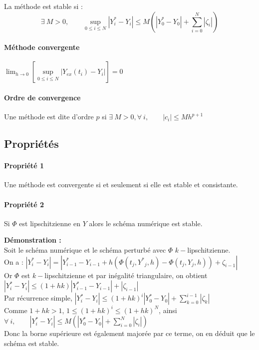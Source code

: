 \documentclass[10pt]{article}
\begin{document}
La méthode est stable si :
 \[\displaystyle \exists~ M>0, \qquad 
 \sup\limits_{0 \leq i \leq N} 
 |   {Y}^*_{i}  -   {Y}_{i} 
 | \leq 
 M \left(|  {Y}^*_0-  {Y_0} |+\sum_{i=0}^N |\zeta_i|\right)  \]

\paragraph{Méthode convergente}
\hfill$ \displaystyle\lim_{h\to 0}\left[\sup\limits_{0\leq i\leq N} |  {Y}_{ex}(t_i)-  {Y}_i| \right] = 0$\hfill ~


\paragraph{Ordre de convergence} Une méthode est dite d'ordre $p$ si $\displaystyle\exists~ M>0, \forall~ i, \qquad |c_i| \leq M h^{p+1}$

\subsection{Propriétés} 

\paragraph{Propriété 1} Une méthode est convergente si et seulement si elle est stable et consistante.

\paragraph{Propriété 2} Si $  {\Phi}$ est lipschitzienne en $  {Y}$ alors le schéma numérique est stable.


\noindent
\textbf{Démonstration :}\\
Soit le schéma numérique et le schéma perturbé avec $  {\Phi}$ $k-$lipschitzienne. \\
On a : $|  {Y}^*_{i}  -   {Y}_{i}| = |  {Y}^*_{i-1}  -   {Y}_{i-1} + h(  {\Phi}( t_j,  {Y^*}_j,h)-  {\Phi}( t_j,  {Y}_j,h)) + \zeta_{i-1}|$\\
Or $  {\Phi}$ est $k-$lipschitzienne et par inégalité triangulaire, on obtient \\
$ |  {Y}^*_{i}  -   {Y}_{i}|\leq (1+hk) |  {Y}^*_{i-1}  -   {Y}_{i-1}| + |\zeta_{i-1}|$\\
Par récurrence simple, $ |  {Y}^*_{i}  -   {Y}_{i}|\leq (1+hk)^{i} |  {Y}^*_{0}  -   {Y}_{0}| +\sum_{k=0}^{i-1} |\zeta_{k}|$\\
Comme $1+hk>1$, $1\leq (1+hk)^i \leq (1+hk)^N$, ainsi\\
$\forall~ i,\qquad |  {Y}^*_{i}  -   {Y}_{i}| \leq M  \left(|  {Y}^*_0-  {Y_0} |+\sum_{i=0}^N |\zeta_i|\right) $\\
Donc la borne supérieure est également majorée par ce terme, on en déduit que le schéma est stable.
\end{document}
